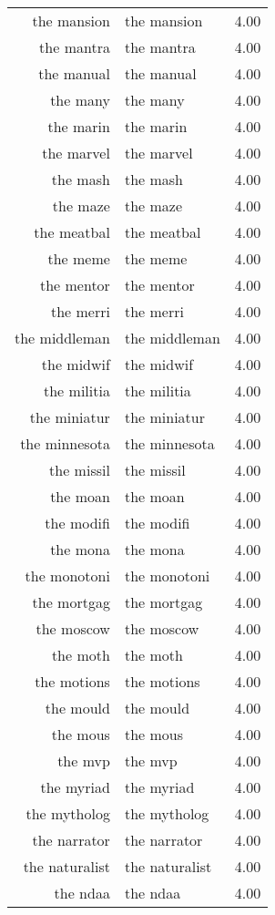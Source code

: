 \begin{table}[ht]
\begin{tabular}{rlr}
  the mansion & the mansion & 4.00 \\ 
  the mantra & the mantra & 4.00 \\ 
  the manual & the manual & 4.00 \\ 
  the many & the many & 4.00 \\ 
  the marin & the marin & 4.00 \\ 
  the marvel & the marvel & 4.00 \\ 
  the mash & the mash & 4.00 \\ 
  the maze & the maze & 4.00 \\ 
  the meatbal & the meatbal & 4.00 \\ 
  the meme & the meme & 4.00 \\ 
  the mentor & the mentor & 4.00 \\ 
  the merri & the merri & 4.00 \\ 
  the middleman & the middleman & 4.00 \\ 
  the midwif & the midwif & 4.00 \\ 
  the militia & the militia & 4.00 \\ 
  the miniatur & the miniatur & 4.00 \\ 
  the minnesota & the minnesota & 4.00 \\ 
  the missil & the missil & 4.00 \\ 
  the moan & the moan & 4.00 \\ 
  the modifi & the modifi & 4.00 \\ 
  the mona & the mona & 4.00 \\ 
  the monotoni & the monotoni & 4.00 \\ 
  the mortgag & the mortgag & 4.00 \\ 
  the moscow & the moscow & 4.00 \\ 
  the moth & the moth & 4.00 \\ 
  the motions & the motions & 4.00 \\ 
  the mould & the mould & 4.00 \\ 
  the mous & the mous & 4.00 \\ 
  the mvp & the mvp & 4.00 \\ 
  the myriad & the myriad & 4.00 \\ 
  the mytholog & the mytholog & 4.00 \\ 
  the narrator & the narrator & 4.00 \\ 
  the naturalist & the naturalist & 4.00 \\ 
  the ndaa & the ndaa & 4.00 \\ 

\end{tabular}
\end{table}
